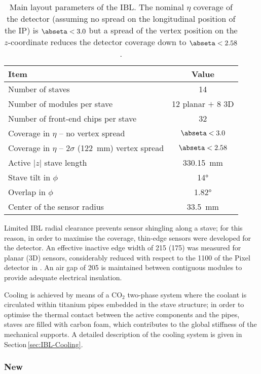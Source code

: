 \documentclass[cernpreprint, atlasdraft=false, UKenglish,british,orcidlogo, texmf, orcidlogo]{atlasdoc}
\begin{document}
\begin{table}
\caption{Main layout parameters of the \gls{IBL}. The nominal $\eta$ coverage of the detector (assuming no spread on the longitudinal position of the \gls{IP})  is $\abseta < 3.0$ but a spread of the vertex position on the $z$-coordinate reduces the detector coverage down to $\abseta < 2.58$.
\label{tab:ID-IBL_TableLayout}
}
\centering
\begin{tabular}{lc}
\hline\hline
Item & Value \\
\hline
Number of staves & 14 \\
Number of modules per stave & 12 planar $+$ 8 3D \\
Number of front-end chips per stave & 32 \\
Coverage in $\eta$ -- no vertex spread & $\abseta<3.0$ \\
Coverage in $\eta$ -- $2\sigma$ (\SI{122}{\mm}) vertex spread
& $\abseta<2.58$ \\
Active $|z|$ stave length  & \SI{330.15}{\mm} \\
Stave tilt in $\phi$ & \ang{14} \\
Overlap in $\phi$ & \ang{1.82} \\
Center of the sensor radius  & \SI{33.5}{\mm} \\
\hline\hline
\end{tabular}
\end{table}
 
Limited \gls{IBL} radial clearance prevents sensor shingling along a stave; for this reason, in order to maximise the coverage, thin-edge sensors were developed for the detector. An effective inactive edge width of \SI{215}{\micron} (\SI{175}{\micron}) was measured for planar (3D) sensors, considerably reduced with respect to the \SI{1100}{\micron}  of the Pixel detector in \RunOne. An air gap of \SI{205}{\micron} is maintained between contiguous modules to provide adequate electrical insulation.
 
Cooling is achieved by means of a ${\text{CO}}_2$ two-phase system where the coolant is circulated within titanium pipes embedded in the stave structure; in order to optimise the thermal contact between the active components and the pipes, staves are filled with carbon foam, which contributes to the global stiffness of the mechanical supports. A detailed description of the cooling system is given in Section\,\ref{sec:IBL-Cooling}.
 
\subsubsection{New \beampipe}
 
\end{document}
